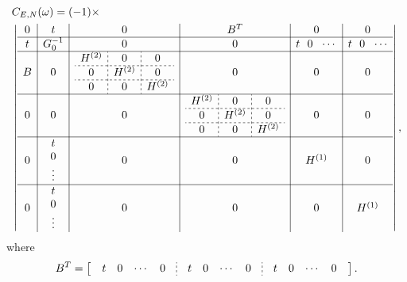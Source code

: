 \documentclass{article}
\begin{document}
\begin{equation}
\begin{split}
    &C_{E,N}(\omega) = (-1) \times\\ 
    &\left\vert
    \begin{array}{c|c|c|c|c|c}
        0 & t & 0 & B^T & 0 & 0 \\
        \hline
        t & G_0^{-1} & 0 & 0 
            & t~~0~~\cdots        
            & t~~0~~\cdots
        \\
        \hline
        B & 0 &
        \begin{array}{c;{2pt/2pt}c;{2pt/2pt}c}
            H^{(2)} & 0 & 0 \\
            \hdashline[2pt/2pt]
            0 & H^{(2)} & 0 \\
            \hdashline[2pt/2pt]
            0 & 0 & H^{(2)} \\
        \end{array}        
        & 0 & 0 & 0 \\
        \hline
        0 & 0 & 0 &
            \begin{array}{c;{2pt/2pt}c;{2pt/2pt}c}
                H^{(2)} & 0 & 0 \\
                \hdashline[2pt/2pt]
                0 & H^{(2)} & 0  \\
                \hdashline[2pt/2pt]
                0 & 0 & H^{(2)}
            \end{array}            
        & 0 & 0 \\
        \hline
        0 & \begin{array}{c}
             t \\ 0 \\ \vdots
        \end{array} &
            0 & 0 &\begin{array}{c} H^{(1)} \end{array} & 0 \\
        \hline
        0 & \begin{array}{c}
             t \\ 0 \\ \vdots
        \end{array} &
            0 & 0 & 0 & \begin{array}{c} H^{(1)} \end{array}
    \end{array}
    \right\vert,
\end{split}
\end{equation}
where
\begin{equation}
    B^T = \left[\begin{array}{c;{2pt/2pt}c;{2pt/2pt}c} 
        \begin{array}{cccc}
             t & 0 & \cdots & 0
        \end{array} &
        \begin{array}{cccc}
             t & 0 & \cdots & 0
        \end{array} &
        \begin{array}{cccc}
             t & 0 & \cdots & 0
        \end{array} 
    \end{array}\right].
\end{equation}
\end{document}
